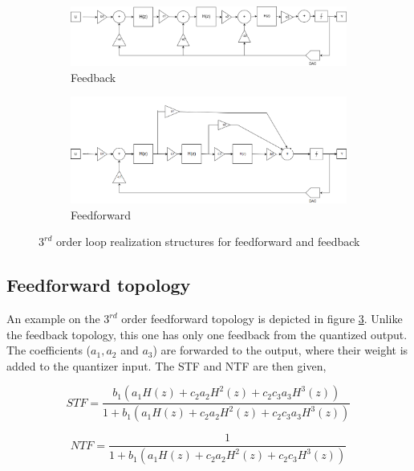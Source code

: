 \begin{figure}[H]
\centering
\begin{subfigure}[b]{0.85\textwidth}
   \includegraphics[width=\textwidth]{images/feedback.png}
   \caption{Feedback}
   \label{fig:back} 
\end{subfigure}

\begin{subfigure}[b]{0.85\textwidth}
   \includegraphics[width=\textwidth]{images/feedforward_no.png}
   \caption{Feedforward}
   \label{fig:forward}
\end{subfigure}

\caption{$3^{rd}$ order loop realization structures for feedforward and feedback}
\end{figure}

\subsection{Feedforward topology}
An example on the $3^{rd}$ order feedforward topology is depicted in figure \ref{fig:forward}. Unlike the feedback topology, this one has only one feedback from the quantized output. The coefficients ($a_1, a_2$ and $a_3$) are forwarded to the output, where their weight is added to the quantizer input. The STF and NTF are then given,

\begin{equation}
    STF = \frac{b_1(a_1H(z) + c_2a_2H^2(z) + c_2c_3a_3H^3(z))}{1 + b_1(a_1H(z) + c_2a_2H^2(z) + c_2c_3a_3H^3(z))}
\end{equation}

\begin{equation}
    NTF = \frac{1}{1 + b_1(a_1H(z) + c_2a_2H^2(z) + c_2c_3H^3(z))}
\end{equation}

